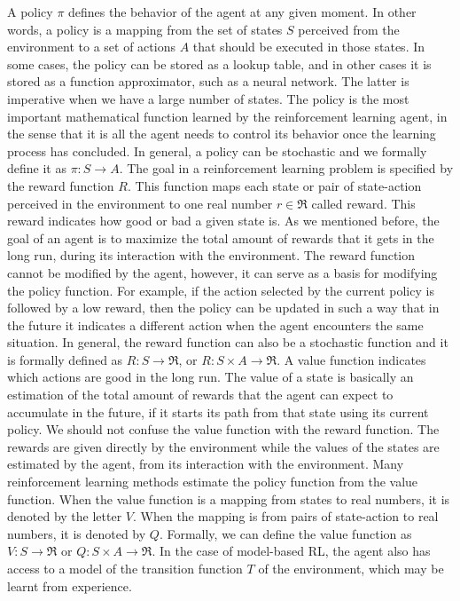 A policy $\pi$ defines the behavior of the agent at any given moment. In other words, a policy is a mapping from the set of states $S$ perceived from the environment to a set of actions $A$ that should be executed in those states. In some cases, the policy can be stored as a lookup table, and in other cases it is stored as a function approximator, such as a neural network. The latter is imperative when we have a large number of states. The policy is the most important mathematical function learned by the reinforcement learning agent, in the sense that it is all the agent needs to control its behavior once the learning process has concluded. In general, a policy can be stochastic and we formally define it as $\pi: S \rightarrow A$.
The goal in a reinforcement learning problem is specified by the reward function $R$. This function maps each state or pair of state-action perceived in the environment to one real number $r \in \Re$ called reward. This reward indicates how good or bad a given state is. As we mentioned before, the goal of an agent is to maximize the total amount of rewards that it gets in the long run, during its interaction with the environment. The reward function cannot be modified by the agent, however, it can serve as a basis for modifying the policy function. For example, if the action selected by the current policy is followed by a low reward, then the policy can be updated in such a way that in the future it indicates a different action when the agent encounters the same situation. In general, the reward function can also be a stochastic function and it is formally defined as $R: S \rightarrow \Re$, or $R: S \times A \rightarrow \Re$.
A value function indicates which actions are good in the long run. The value of a state is basically an estimation of the total amount of rewards that the agent can expect to accumulate in the future, if it starts its path from that state using its current policy. We should not confuse the value function with the reward function. The rewards are given directly by the environment while the values of the states are estimated by the agent, from its interaction with the environment. Many reinforcement learning methods estimate the policy function from the value function. When the value function is a mapping from states to real numbers, it is denoted by the letter $V$. When the mapping is from pairs of state-action to real numbers, it is denoted by $Q$. Formally, we can define the value function as $V: S \rightarrow \Re$ or $Q: S \times A\rightarrow \Re$.
In the case of model-based RL, the agent also has access to a model of the transition function $T$ of the environment, which may be learnt from experience.
